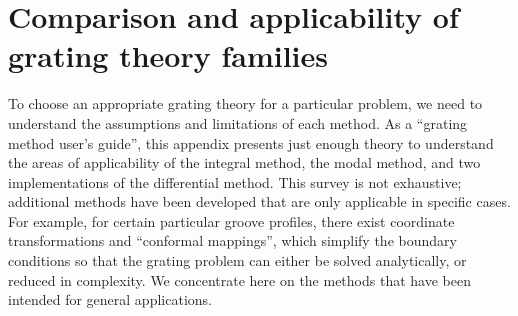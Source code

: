 \documentclass[singlespace,proposal]{uofsthesis-cs}
\begin{document}





%

\uofsappendix

\chapter{Comparison and applicability of\\grating theory families}
\label{methodComparison}
To choose an appropriate grating theory for a particular problem, we need to understand the assumptions and limitations of each method.  As a ``grating method user's guide'', this appendix presents just enough theory to understand the areas of applicability of the integral method, the modal method, and two implementations of the differential method.  This survey is not exhaustive; additional methods have been developed that are only applicable in specific cases.  For example, for certain particular groove profiles, there exist coordinate transformations and ``conformal mappings'', which simplify the boundary conditions so that the grating problem can either be solved analytically, or reduced in complexity.  We concentrate here on the methods that have been intended for general applications.
\end{document}
